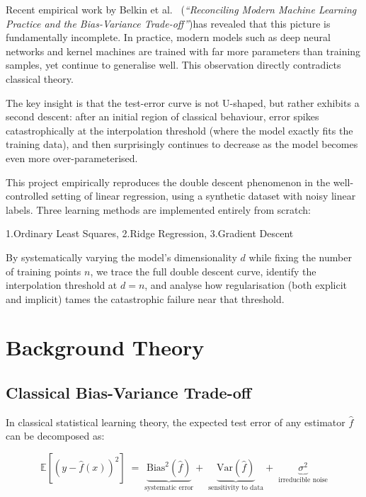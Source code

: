 \documentclass[12pt, a4paper]{article}
\newcommand{\E}{\mathbb{E}}
\begin{document}
Recent empirical work by Belkin et al.~\cite{belkin2019reconciling} (\textit{``Reconciling Modern Machine Learning Practice and the Bias-Variance Trade-off''})has revealed that this picture is fundamentally incomplete. In practice, modern models such as deep neural networks and kernel machines are trained with far more parameters than training samples, yet continue to generalise well. This observation directly contradicts classical theory.

The key insight is that the test-error curve is not U-shaped, but rather exhibits a second descent: after an initial region of classical behaviour, error spikes catastrophically at the interpolation threshold (where the model exactly fits the training data), and then surprisingly continues to decrease as the model becomes even more over-parameterised.

This project empirically reproduces the double descent phenomenon in the well-controlled setting of linear regression, using a synthetic dataset with noisy linear labels. Three learning methods are implemented entirely from scratch:

1.Ordinary Least Squares,
2.Ridge Regression,
3.Gradient Descent

By systematically varying the model's dimensionality $d$ while fixing the number of training points $n$, we trace the full double descent curve, identify the interpolation threshold at $d = n$, and analyse how regularisation (both explicit and implicit) tames the catastrophic failure near that threshold.

\section{Background Theory}

\subsection{Classical Bias-Variance Trade-off}

In classical statistical learning theory, the expected test error of any estimator $\hat{f}$ can be decomposed as:

\begin{equation}
  \E\!\left[(y - \hat{f}(x))^2\right]
  \;=\;
  \underbrace{\mathrm{Bias}^2(\hat{f})}_{\text{systematic error}}
  +\;
  \underbrace{\mathrm{Var}(\hat{f})}_{\text{sensitivity to data}}
  +\;
  \underbrace{\sigma^2}_{\text{irreducible noise}}
  \label{eq:bv}
\end{equation}
\end{document}
